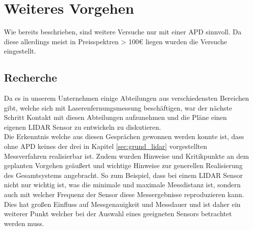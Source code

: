 \section{Weiteres Vorgehen}
Wie bereits beschrieben, sind weitere Versuche nur mit einer \ac{APD} sinnvoll. Da diese allerdings meist in Preisspektren > 100€ liegen wurden die Versuche eingestellt.
\subsection{Recherche}
Da es in unserem Unternehmen einige Abteilungen aus verschiedensten Bereichen gibt, welche sich mit Laserenfernungsmessung beschäftigen, war der nächste Schritt Kontakt mit diesen Abteilungen aufzunehmen und die Pläne einen eigenen \ac{LIDAR} Sensor zu entwickeln zu diskutieren. \\ 
Die Erkenntnis welche aus diesen Gesprächen gewonnen werden konnte ist, dass ohne \ac{APD} keines der drei in Kapitel \ref{sec:grund_lidar}  vorgestellten Messverfahren realisierbar ist. Zudem wurden Hinweise und Kritikpunkte an dem geplanten Vorgehen geäußert und wichtige Hinweise zur generellen Realisierung des Gesamtsystems angebracht. So zum Beispiel, dass bei einem \ac{LIDAR} Sensor nicht nur wichtig ist, was die minimale und maximale Messdistanz ist, sondern auch mit welcher Frequenz der Sensor diese Messergebnisse reproduzieren kann. Dies hat großen Einfluss auf Messgenauigkeit und Messdauer und ist daher ein weiterer Punkt welcher bei der Auswahl eines geeigneten Sensors betrachtet werden muss.
